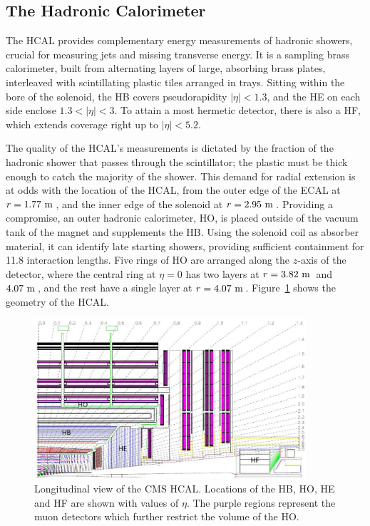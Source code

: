 

\subsection{The Hadronic Calorimeter}
The \ac{HCAL} provides complementary energy measurements of hadronic showers, crucial for measuring jets and missing transverse energy.
It is a sampling brass calorimeter, built from alternating layers of large, absorbing brass plates, interleaved with scintillating plastic tiles arranged in trays. 
Sitting within the bore of the solenoid, the \ac{HB} covers pseudorapidity $|\eta|<1.3$,
and the \ac{HE} on each side enclose $1.3<|\eta|<3$.
To attain a most hermetic detector, there is also a \ac{HF}, which extends coverage right up to $|\eta|<5.2$.

The quality of the \ac{HCAL}'s measurements is dictated by the fraction of the hadronic shower that passes through the scintillator; the plastic must be thick enough to catch the majority of the shower.
This demand for radial extension is at odds with the location of the \ac{HCAL}, from the outer edge of the \ac{ECAL} at $r=1.77~\mathrm{m}\,$, and the inner edge of the solenoid at $r=2.95~\mathrm{m}\,$.
Providing a compromise, an outer hadronic calorimeter, \ac{HO}, is placed outside of the vacuum tank of the magnet and supplements the \ac{HB}.
Using the solenoid coil as absorber material, it can identify late starting showers, providing sufficient containment for 11.8 interaction lengths.%
Five rings of \ac{HO} are arranged along the $z$-axis of the detector, where the central ring at $\eta=0$ has two layers at $r=3.82~\mathrm{m}\,$ and $4.07~\mathrm{m}\,$, and the rest have a single layer at $r=4.07~\mathrm{m}\,$. 
Figure~\ref{fig:CMShcal} shows the geometry of the \ac{HCAL}.

\begin{figure}[htbp]
  \begin{center}
  \includegraphics[width=0.9\textwidth]{Figures/detector/cmsHCAL}
  \caption{Longitudinal view of the \ac{CMS} \ac{HCAL}. Locations of the \ac{HB}, \ac{HO}, \ac{HE} and \ac{HF} are shown with values of $\eta$. The purple regions represent the muon detectors which further restrict the volume of the \ac{HO}.
}
  \label{fig:CMShcal}
  \end{center}
\end{figure}

